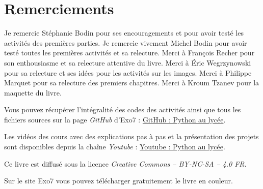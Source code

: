 
\clearemptydoublepage
\pagestyle{empty}\thispagestyle{empty}

\vspace*{\fill}

\section*{Remerciements}


Je remercie Stéphanie Bodin pour ses encouragements et pour avoir testé les activités des premières parties.
Je remercie vivement Michel Bodin pour avoir testé toutes les premières activités et sa relecture.
Merci à François Recher pour son enthousiasme et sa relecture attentive du livre. 
Merci à Éric Wegrzynowski pour sa relecture et ses idées pour les activités sur les images. 
Merci à Philippe Marquet pour sa relecture des premiers chapitres. Merci à Kroum Tzanev pour la maquette du livre.


\bigskip

\begin{center}
Vous pouvez récupérer l'intégralité des codes \Python{} des activités ainsi que tous les fichiers sources sur la page \emph{GitHub} d'Exo7 :
\href{https://github.com/exo7math/python1-exo7}{\og{}GitHub : Python au lycée\fg{}}.

\medskip

Les vidéos des cours avec des explications pas à pas et la présentation des projets sont disponibles depuis la chaîne \emph{Youtube} :
\href{https://www.youtube.com/channel/UC6PiFyqBiUjiJ7Q3DRSW2Wg}{\og{}Youtube : Python au lycée\fg{}}.


\end{center}


\vspace*{\fill}

\bigskip 

\begin{center}
\end{center}



\begin{center}
Ce livre est diffusé sous la licence \emph{Creative Commons -- BY-NC-SA -- 4.0 FR}.

Sur le site Exo7 vous pouvez télécharger gratuitement le livre en couleur.
\end{center}




\printindex
{}

